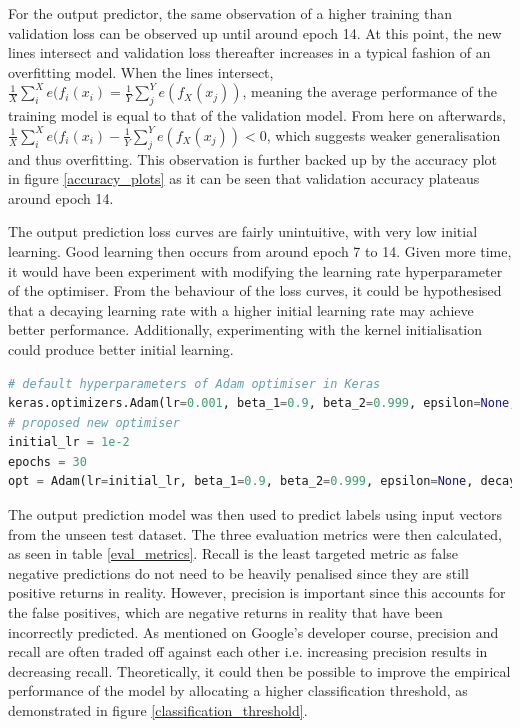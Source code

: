 \documentclass[10pt,onecolumn,letterpaper]{article}
\begin{document}
For the output predictor, the same observation of a higher training than validation loss can be observed up until around epoch 14. At this point, the new lines intersect and validation loss thereafter increases in a typical fashion of an overfitting model. When the lines intersect, $\frac{1}{X} \sum^{X}_{i}e(f_{i}(x_{i}) = \frac{1}{Y} \sum^{Y}_{j}e(f_{X}(x_{j}))$, meaning the average performance of the training model is equal to that of the validation model. From here on afterwards, $\frac{1}{X} \sum^{X}_{i}e(f_{i}(x_{i}) - \frac{1}{Y} \sum^{Y}_{j}e(f_{X}(x_{j})) < 0$, which suggests weaker generalisation and thus overfitting. This observation is further backed up by the accuracy plot in figure \ref{accuracy_plots} as it can be seen that validation accuracy plateaus around epoch 14. 

The output prediction loss curves are fairly unintuitive, with very low initial learning. Good learning then occurs from around epoch 7 to 14. Given more time, it would have been experiment with modifying the learning rate hyperparameter of the optimiser. From the behaviour of the loss curves, it could be hypothesised that a decaying learning rate with a higher initial learning rate may achieve better performance. Additionally, experimenting with the kernel initialisation could produce better initial learning. 

\begin{lstlisting}[language=Python, breaklines=true, label={libraries}, caption={New proposed implementation of the optimiser.}]
# default hyperparameters of Adam optimiser in Keras
keras.optimizers.Adam(lr=0.001, beta_1=0.9, beta_2=0.999, epsilon=None, decay=0.0, amsgrad=False)
# proposed new optimiser
initial_lr = 1e-2
epochs = 30
opt = Adam(lr=initial_lr, beta_1=0.9, beta_2=0.999, epsilon=None, decay=initial_lr/epochs, amsgrad=False)
\end{lstlisting} 

The output prediction model was then used to predict labels using input vectors from the unseen test dataset. The three evaluation metrics were then calculated, as seen in table \ref{eval_metrics}. Recall is the least targeted metric as false negative predictions do not need to be heavily penalised since they are still positive returns in reality. However, precision is important since this accounts for the false positives, which are negative returns in reality that have been incorrectly predicted. As mentioned on Google's developer course\cite{google}, precision and recall are often traded off against each other i.e. increasing precision results in decreasing recall. Theoretically, it could then be possible to improve the empirical performance of the model by allocating a higher classification threshold, as demonstrated in figure \ref{classification_threshold}.
\end{document}
